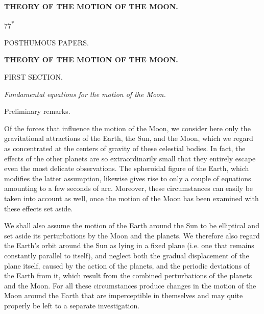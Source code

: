 \clearpage
\begingroup
{}
\renewcommand{\headrulewidth}{0pt}
\clearpage
{}
\begin{center}
\vspace*{.15\textheight}
{\Large\bfseries THEORY OF THE MOTION OF THE MOON.\par}
\end{center}
\vspace{.28\textheight}
\par\noindent\hfill 77\textsuperscript{*}\par

\clearpage
{}
\begin{center}
{\large POSTHUMOUS PAPERS.\par}
\bigskip
{\Large\bfseries THEORY OF THE MOTION OF THE MOON.\par}
\bigskip
FIRST SECTION.
\medskip

\textit{Fundamental equations for the motion of the Moon.}
\bigskip

{\large Preliminary remarks.\par}
\end{center}

\par\noindent\hspace*{\parindent}Of the forces that influence the motion of the Moon, we consider here
only the gravitational attractions of the Earth, the Sun, and the Moon, which
we regard as concentrated at the centers of gravity of these celestial bodies. In
fact, the effects of the other planets are so extraordinarily small that
they entirely escape even the most delicate observations. The spheroidal
figure of the Earth, which modifies the latter assumption, likewise
gives rise to only a couple of equations amounting to a few seconds of arc. Moreover,
these circumstances can easily be taken into account as well, once the
motion of the Moon has been examined with these effects set aside.

\par\noindent\hspace*{\parindent}We shall also assume the motion of the Earth around the Sun to be elliptical
and set aside its perturbations by the Moon and the planets.
We therefore also regard the Earth's orbit around the Sun as lying
in a fixed plane (i.e. one that remains constantly parallel to itself),
and neglect both the gradual displacement
of the plane itself, caused by the action of the planets,
and the periodic deviations of the Earth from it, which result from the
combined perturbations of the planets and the Moon. For all these
circumstances produce changes in the motion of the Moon around the Earth that
are imperceptible in themselves and may quite properly be left to a separate
investigation.

